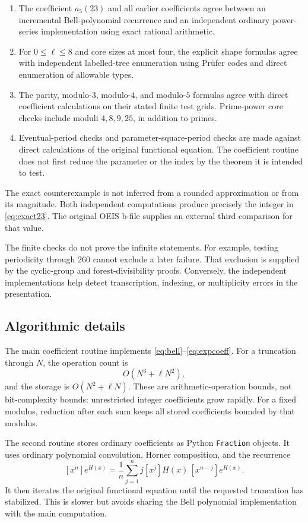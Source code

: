 \documentclass[11pt,letterpaper]{article}
\theoremstyle{definition}
\theoremstyle{remark}
\begin{document}
\begin{enumerate}[leftmargin=*,itemsep=0.2em]
\item The coefficient $a_5(23)$ and all earlier coefficients agree between
an incremental Bell-polynomial recurrence and an independent ordinary
power-series implementation using exact rational arithmetic.
\item For $0\le\ell\le8$ and core sizes at most four, the explicit
shape formulas agree with independent labelled-tree enumeration using
Pr\"ufer codes and direct enumeration of allowable types.
\item The parity, modulo-$3$, modulo-$4$, and modulo-$5$ formulas agree
with direct coefficient calculations on their stated finite test grids.
Prime-power core checks include moduli $4,8,9,25$, in addition to primes.
\item Eventual-period checks and parameter-square-period checks are made
against direct calculations of the original functional equation. The
coefficient routine does not first reduce the parameter or the index by
the theorem it is intended to test.
\end{enumerate}

The exact counterexample is not inferred from a rounded approximation or
from its magnitude. Both independent computations produce precisely the
integer in \eqref{eq:exact23}. The original OEIS b-file supplies an
external third comparison for that value.

The finite checks do not prove the infinite statements. For example,
testing periodicity through $260$ cannot exclude a later failure. That
exclusion is supplied by the cyclic-group and forest-divisibility proofs.
Conversely, the independent implementations help detect transcription,
indexing, or multiplicity errors in the presentation.

\subsection{Algorithmic details}
The main coefficient routine implements
\eqref{eq:bell}--\eqref{eq:expcoeff}. For a truncation through $N$, the
operation count is
\[
 O(N^3+\ell N^2),
\]
and the storage is $O(N^2+\ell N)$. These are arithmetic-operation
bounds, not bit-complexity bounds: unrestricted integer coefficients grow
rapidly. For a fixed modulus, reduction after each sum keeps all stored
coefficients bounded by that modulus.

The second routine stores ordinary coefficients as Python
\texttt{Fraction} objects. It uses ordinary polynomial convolution,
Horner composition, and the recurrence
\[
 [x^n]e^{H(x)}=\frac1n\sum_{j=1}^n j[x^j]H(x)\,[x^{n-j}]e^{H(x)}.
\]
It then iterates the original functional equation until the requested
truncation has stabilized. This is slower but avoids sharing the Bell
polynomial implementation with the main computation.
\end{document}
